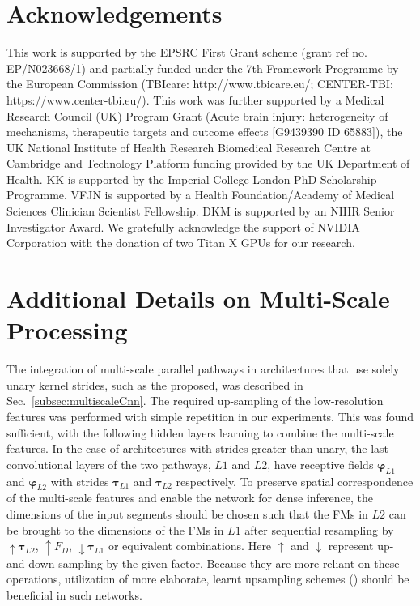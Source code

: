 \documentclass[preprint,authoryear,12pt]{elsarticle}
\begin{document}
\section*{Acknowledgements}

This work is supported by the EPSRC First Grant scheme (grant ref no. EP/N023668/1) and partially funded under the 7th Framework Programme by the European Commission (TBIcare: http://www.tbicare.eu/; CENTER-TBI: https://www.center-tbi.eu/).
This work was further supported by a Medical Research Council (UK) Program Grant (Acute brain injury: heterogeneity of mechanisms, therapeutic targets and outcome effects [G9439390 ID 65883]), the UK National Institute of Health Research Biomedical Research Centre at Cambridge and Technology Platform funding provided by the UK Department of Health. KK is supported by the Imperial College London PhD Scholarship Programme. VFJN is supported by a Health Foundation/Academy of Medical Sciences Clinician Scientist Fellowship. DKM is supported by an NIHR Senior Investigator Award. We gratefully acknowledge the support of NVIDIA Corporation with the donation of two Titan X GPUs for our research.
 


\appendix



\section{Additional Details on Multi-Scale Processing}
\label{app:detailsMultiscale}

The integration of multi-scale parallel pathways in architectures that use solely unary kernel strides, such as the proposed, was described in Sec.~\ref{subsec:multiscaleCnn}. The required up-sampling of the low-resolution features was performed with simple repetition in our experiments. This was found sufficient, with the following hidden layers learning to combine the multi-scale features. In the case of architectures with strides greater than unary, the last convolutional layers of the two pathways, $L1$ and $L2$, have receptive fields $\boldsymbol{\varphi}_{L1}$ and $\boldsymbol{\varphi}_{L2}$ with strides $\boldsymbol{\tau}_{L1}$ and $\boldsymbol{\tau}_{L2}$ respectively. To preserve spatial correspondence of the multi-scale features and enable the network for dense inference, the dimensions of the input segments should be chosen such that the FMs in $L2$ can be brought to the dimensions of the FMs in $L1$ after sequential resampling by $\uparrow \boldsymbol{\tau}_{L2}$, $\uparrow F_D$, $\downarrow \boldsymbol{\tau}_{L1}$ or equivalent combinations. Here $\uparrow$ and $\downarrow$ represent up- and down-sampling by the given factor. Because they are more reliant on these operations, utilization of more elaborate, learnt upsampling schemes (\cite{Long2014, Ronneberger2015, Noh2015}) should be beneficial in such networks.
\end{document}
